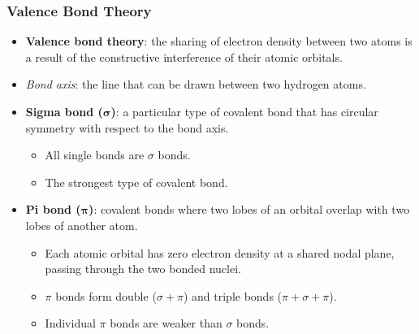\documentclass[12pt,a4paper]{article}
\begin{document}
\begin{itemize}
    \subsubsection{Valence Bond Theory}
    \begin{itemize}
    \item \textbf{Valence bond theory}: the sharing of electron density between two atoms is a result of the constructive interference of their atomic orbitals.
    \item \textit{Bond axis}: the line that can be drawn between two hydrogen atoms.
    \item \textbf{Sigma bond (\(\bm{\sigma}\))}: a particular type of covalent bond that has circular symmetry with respect to the bond axis.
        \begin{itemize}
            \item All single bonds are $\sigma$ bonds.
            \item The strongest type of covalent bond.
        \end{itemize}
    \item \textbf{Pi bond ($\bm{\pi}$)}: covalent bonds where two lobes of an orbital overlap with two lobes of another atom. 
        \begin{itemize}
            \item Each atomic orbital has zero electron density at a shared nodal plane, passing through the two bonded nuclei.
            \item $\pi$ bonds form double ($\sigma + \pi$) and triple bonds ($\pi + \sigma + \pi$).
            \item Individual $\pi$ bonds are weaker than $\sigma$ bonds.
        \end{itemize}
    \end{itemize}


\end{itemize}
\end{document}
